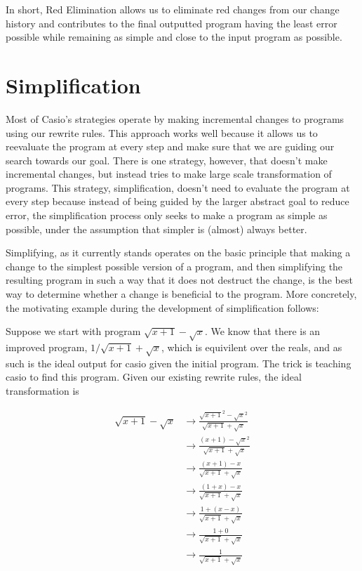 \documentclass{article}
\newcommand{\sqrsqrt}[1]{\sqrt{#1}^2}
\begin{document}
In short, 
Red Elimination allows us to eliminate
red changes from our change history 
and contributes to the final outputted 
program having the least error possible 
while remaining as simple 
and close to the input program 
as possible.

\section{Simplification}

Most of Casio's strategies 
operate by making incremental changes 
to programs using our rewrite rules. 
This approach works well 
because it allows us to reevaluate the program 
at every step 
and make sure that we are guiding our search 
towards our goal. 
There is one strategy, however, 
that doesn't make incremental changes, 
but instead tries to make 
large scale transformation of programs. 
This strategy, simplification, 
doesn't need to evaluate 
the program at every step 
because instead of being guided 
by the larger abstract goal 
to reduce error, 
the simplification process only seeks 
to make a program as simple as possible, 
under the assumption that 
simpler is (almost) always better.

Simplifying, 
as it currently stands 
operates on the basic principle 
that making a change to the 
simplest possible version of a program, 
and then simplifying the resulting program 
in such a way that 
it does not destruct the change, 
is the best way to determine 
whether a change is beneficial 
to the program. 
More concretely, 
the motivating example during 
the development of simplification follows:

Suppose we start with program $\sqrt{x+1} - \sqrt{x}$. 
We know that there is an improved program, 
$1/\sqrt{x+1} + \sqrt{x}$, 
which is equivilent over the reals, 
and as such is the ideal output 
for casio given the initial program. 
The trick is teaching casio 
to find this program. 
Given our existing rewrite rules, 
the ideal transformation is 

\begin{align*}
\sqrt{x + 1} - \sqrt{x} &\to \frac{\sqrsqrt{x + 1} - \sqrsqrt{x}}{\sqrt{x + 1} + \sqrt{x}}\\
&\to \frac{(x + 1) - \sqrsqrt{x}}{\sqrt{x + 1} + \sqrt{x}}\\
&\to \frac{(x + 1) - x}{\sqrt{x + 1} + \sqrt{x}}\\
&\to \frac{(1 + x) - x}{\sqrt{x + 1} + \sqrt{x}}\\
&\to \frac{1 + (x - x)}{\sqrt{x + 1} + \sqrt{x}}\\
&\to \frac{1 + 0}{\sqrt{x + 1} + \sqrt{x}}\\
&\to \frac{1}{\sqrt{x + 1} + \sqrt{x}}
\end{align*}
\end{document}
